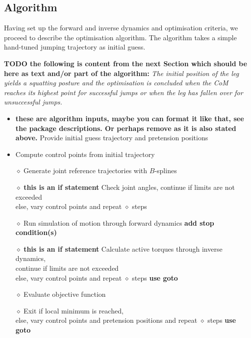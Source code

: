 \documentclass[letterpaper, 10 pt, conference]{ieeeconf}  %
\begin{document}
\subsection{Algorithm}
\label{subsec:algorithm}
Having set up the forward and inverse dynamics and optimisation criteria, we proceed to describe the optimisation algorithm. The algorithm takes a simple hand-tuned jumping trajectory as initial guess.

\textbf{TODO the following is content from the next Section which should be here as text and/or part of the algorithm:}
\textit{The initial position of the leg yields a squatting posture and the optimisation is concluded when the CoM reaches its highest point for successful jumps or when the leg has fallen over for unsuccessful jumps.}

\begin{itemize}
	\item \textbf{these are algorithm inputs, maybe you can format it like that, see the package descriptions. Or perhaps remove as it is also stated above.} Provide initial guess trajectory and pretension positions
	\item Compute control points from initial trajectory\\
	\item[$\diamond$] Generate joint reference trajectories with $B$-splines
	\item[$\diamond$] \textbf{this is an if statement} Check joint angles, continue if limits are not exceeded \\else, vary control points and repeat $\diamond$ steps
	\item[$\diamond$] Run simulation of motion through forward dynamics \textbf{add stop condition(s)}
	\item[$\diamond$] \textbf{this is an if statement} Calculate active torques through inverse dynamics,\\ continue if limits are not exceeded \\else, vary control points and repeat $\diamond$ steps \textbf{use goto}
	\item[$\diamond$] Evaluate objective function\\
	\item[$\diamond$] Exit if local minimum is reached, \\ else, vary control points and pretension positions and repeat $\diamond$ steps \textbf{use goto}
\end{itemize}
\end{document}
